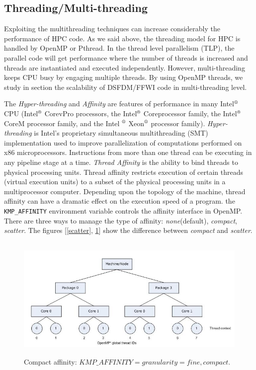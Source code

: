 \subsection{Threading/Multi-threading}
Exploiting the multithreading techniques can increase considerably the performance of HPC code. As we said above, the threading model for HPC is handled by OpenMP or Pthread. In the thread level parallelism (TLP), the parallel code will get performance where the number of threads is increased and threads are instantiated and executed independently. However, multi-threading keeps CPU busy by engaging multiple threads. By using OpenMP threads, we study in section the scalability of DSFDM/FFWI code in multi-threading level. 

The \textit{Hyper-threading} and \textit{Affinity} are features of performance in many Intel$^{\mbox{\scriptsize{\textregistered}}}$ CPU (Intel$^{\mbox{\scriptsize{\textregistered}}}$ Core\texttrademark vPro   \texttrademark processors, the Intel$^{\mbox{\scriptsize{\textregistered}}}$ Core\texttrademark processor family, the Intel$^{\mbox{\scriptsize{\textregistered}}}$ Core\texttrademark M processor family, and the Intel $^{\mbox{\scriptsize{\textregistered}}}$ Xeon$^{\mbox{\scriptsize{\textregistered}}}$ processor family). \textit{Hyper-threading} is Intel's proprietary simultaneous multithreading (SMT) implementation used to improve parallelization of computations performed on x86 microprocessors. Instructions from more than one thread can be executing in any pipeline stage at a time. \textit{Thread Affinity} is the ability to bind threads to physical processing units. Thread affinity restricts execution of certain threads (virtual execution units) to a subset of the physical processing units in a multiprocessor computer. Depending upon the topology of the machine, thread affinity can have a dramatic effect on the execution speed of a program. the \verb|KMP_AFFINITY| environment variable controls the affinity interface in OpenMP. There are three ways to manage the type of affinity: \textit{none}(default), \textit{compact}, \textit{scatter}. The figures [\ref{scatter}, \ref{compact}] show the difference between \textit{compact} and \textit{scatter}.

\begin{figure}[!h]
\centering 
\includegraphics[height=6cm,width=12cm]{images/compact.png}
    \caption{Compact affinity: $KMP\_AFFINITY=granularity=fine,compact$.}
\label{compact} 
\end{figure}  

